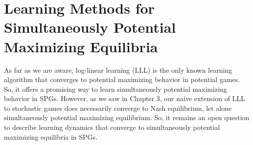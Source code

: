 \section{Learning Methods for Simultaneously Potential Maximizing Equilibria}

As far as we are aware, log-linear learning (LLL) is the only known learning algorithm that converges to potential maximizing behavior in potential games. So, it offers a promising way to learn simultaneously potential maximizing behavior in SPGs. However, as we saw in Chapter 3, our naive extension of LLL to stochastic games does necessarily converge to Nash equilibrium, let alone simultaneously potential maximizing equilibrium. So, it remains an open question to describe learning dynamics that converge to simultaneously potential maximizing equilibria in SPGs.